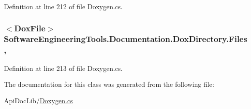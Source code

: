 Definition at line 212 of file Doxygen.\+cs.

\hypertarget{class_software_engineering_tools_1_1_documentation_1_1_dox_directory_aa76527e2b4b70c0badbaa9fbd95a9d11}{
\subsubsection[{Files}]{$<${\bf Dox\+File}$>$ Software\+Engineering\+Tools.\+Documentation.\+Dox\+Directory.\+Files\hspace{0.3cm}{\ttfamily [get]}, {\ttfamily [set]}}}\label{class_software_engineering_tools_1_1_documentation_1_1_dox_directory_aa76527e2b4b70c0badbaa9fbd95a9d11}


Definition at line 213 of file Doxygen.\+cs.



The documentation for this class was generated from the following file\+:\begin{DoxyCompactItemize}
\item 
Api\+Doc\+Lib/\hyperlink{_doxygen_8cs}{Doxygen.\+cs}\end{DoxyCompactItemize}
